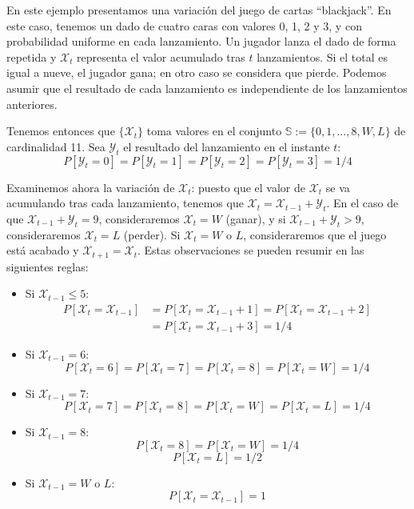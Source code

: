 \begin{exampleth}
En este ejemplo presentamos una variación del juego de cartas \enquote{blackjack}. En este caso, tenemos un dado de cuatro caras con valores 0, 1, 2 y 3, y con probabilidad uniforme en cada lanzamiento. Un jugador lanza el dado de forma repetida y $\mathcal{X}_t$ representa el valor acumulado tras $t$ lanzamientos. Si el total es igual a nueve, el jugador gana; en otro caso se considera que pierde. Podemos asumir que el resultado de cada lanzamiento es independiente de los lanzamientos anteriores.

Tenemos entonces que $\{\mathcal{X}_t\}$ toma valores en el conjunto $\mathbb{S}:=\{0,1,...,8,W,L\}$ de cardinalidad 11. Sea $\mathcal{Y}_t$ el resultado del lanzamiento en el instante $t$:
\[
P[\mathcal{Y}_t=0]=P[\mathcal{Y}_t=1]=P[\mathcal{Y}_t=2]=P[\mathcal{Y}_t=3]=1/4
\]

Examinemos ahora la variación de $\mathcal{X}_t$: puesto que el valor de $\mathcal{X}_t$ se va acumulando tras cada lanzamiento, tenemos que $\mathcal{X}_t=\mathcal{X}_{t-1}+\mathcal{Y}_t$. En el caso de que $\mathcal{X}_{t-1}+\mathcal{Y}_t=9$, consideraremos $\mathcal{X}_t=W$ (ganar), y si $\mathcal{X}_{t-1}+\mathcal{Y}_t>9$, consideraremos $\mathcal{X}_t=L$ (perder). Si $\mathcal{X}_{t}=W$ o $L$, consideraremos que el juego está acabado y $\mathcal{X}_{t+1}=\mathcal{X}_{t}$. Estas observaciones se pueden resumir en las siguientes reglas:

\begin{itemize}
    \item Si $\mathcal{X}_{t-1}\leq5$:
    \[\begin{aligned}
        P[\mathcal{X}_t=\mathcal{X}_{t-1}]&=P[\mathcal{X}_t=\mathcal{X}_{t-1}+1]
        =P[\mathcal{X}_t=\mathcal{X}_{t-1}+2]\\&=P[\mathcal{X}_t=\mathcal{X}_{t-1}+3]=1/4
    \end{aligned}
    \]
    \item Si $\mathcal{X}_{t-1}=6$:
    \[
    P[\mathcal{X}_t=6]=P[\mathcal{X}_t=7]=P[\mathcal{X}_t=8]=P[\mathcal{X}_t=W]=1/4
    \]
    \item Si $\mathcal{X}_{t-1}=7$:
    \[
    P[\mathcal{X}_t=7]=P[\mathcal{X}_t=8]=P[\mathcal{X}_t=W]=P[\mathcal{X}_t=L]=1/4
    \]
    \item Si $\mathcal{X}_{t-1}=8$:
    \[
        P[\mathcal{X}_t=8]=P[\mathcal{X}_t=W]=1/4
    \]\[
        P[\mathcal{X}_t=L]=1/2
    \]
    \item Si $\mathcal{X}_{t-1}=W$ o $L$:
    \[
        P[\mathcal{X}_t=\mathcal{X}_{t-1}]=1
    \]
\end{itemize}


\end{exampleth}
